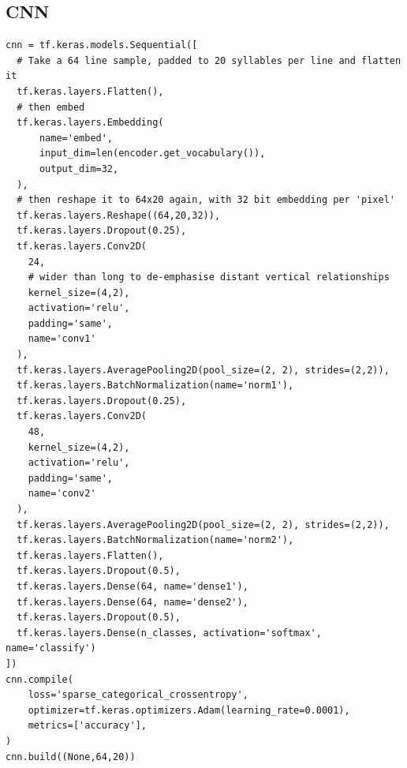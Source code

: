 \documentclass[
    twocolumn,
    hf,
]{ceurart}
\begin{document}
\subsection{CNN}\label{app:cnn}
\begin{verbatim}
cnn = tf.keras.models.Sequential([
  # Take a 64 line sample, padded to 20 syllables per line and flatten it
  tf.keras.layers.Flatten(),
  # then embed
  tf.keras.layers.Embedding(
      name='embed',
      input_dim=len(encoder.get_vocabulary()),
      output_dim=32,
  ),
  # then reshape it to 64x20 again, with 32 bit embedding per 'pixel'
  tf.keras.layers.Reshape((64,20,32)),
  tf.keras.layers.Dropout(0.25),
  tf.keras.layers.Conv2D(
    24,
    # wider than long to de-emphasise distant vertical relationships
    kernel_size=(4,2), 
    activation='relu',
    padding='same',
    name='conv1'
  ),
  tf.keras.layers.AveragePooling2D(pool_size=(2, 2), strides=(2,2)),
  tf.keras.layers.BatchNormalization(name='norm1'),
  tf.keras.layers.Dropout(0.25),
  tf.keras.layers.Conv2D(
    48,
    kernel_size=(4,2),
    activation='relu',
    padding='same',
    name='conv2'
  ),
  tf.keras.layers.AveragePooling2D(pool_size=(2, 2), strides=(2,2)),
  tf.keras.layers.BatchNormalization(name='norm2'),
  tf.keras.layers.Flatten(),
  tf.keras.layers.Dropout(0.5),
  tf.keras.layers.Dense(64, name='dense1'),
  tf.keras.layers.Dense(64, name='dense2'),
  tf.keras.layers.Dropout(0.5),
  tf.keras.layers.Dense(n_classes, activation='softmax', name='classify')
])
cnn.compile(
    loss='sparse_categorical_crossentropy',
    optimizer=tf.keras.optimizers.Adam(learning_rate=0.0001),
    metrics=['accuracy'],
)
cnn.build((None,64,20))
\end{verbatim}
\end{document}
